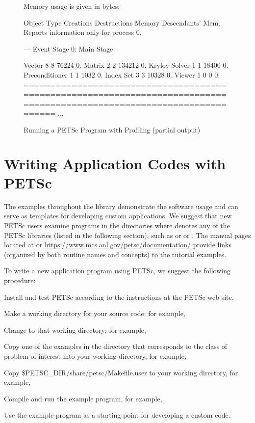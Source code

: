 \begin{figure}[H]
{\begin{outputlisting}[\fontsize{7.5pt}{8pt}\ttfamily]
Memory usage is given in bytes:

Object Type          Creations   Destructions     Memory  Descendants' Mem.
Reports information only for process 0.

--- Event Stage 0: Main Stage

              Vector     8              8        76224     0.
              Matrix     2              2       134212     0.
       Krylov Solver     1              1        18400     0.
      Preconditioner     1              1         1032     0.
           Index Set     3              3        10328     0.
              Viewer     1              0            0     0.
========================================================================================================================
...
\end{outputlisting}
}
\nobreak
\caption{Running a PETSc Program with Profiling (partial output)}
\label{fig_exprof}
\end{figure}

\section{Writing Application Codes with PETSc}
\label{applicatation}

The examples throughout the library demonstrate the software usage
and can serve as templates for developing
custom applications.  We suggest that new PETSc
users examine programs in the directories
where 
denotes any of the PETSc libraries (listed in the following
section), such as  or   or .
The manual pages located at  or 
\href{https://www.mcs.anl.gov/petsc/documentation/}{https://www.mcs.anl.gov/petsc/documentation/}
provide links (organized by both routine names and concepts) to the tutorial examples.

To write a new application program using PETSc, we suggest the
following procedure:
\begin{tightenumerate}
\item Install and test PETSc according to the instructions at the PETSc web site.
\item Make a working directory for your source code: for example, 
\item Change to that working directory; for example,
\item Copy one of the examples in the directory
      that corresponds to the class of problem of interest into your working directory, for example, 
\item Copy \$PETSC\_DIR/share/petsc/Makefile.user to your working directory, for example, 
\item Compile and run the example program, for example, 
\item Use the example program as a starting point for developing a custom code.
\end{tightenumerate}

